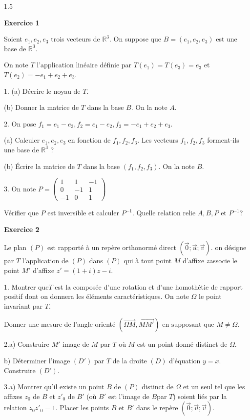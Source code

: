 \documentclass[12pt]{article}
\begin{document}
\begin{spacing}{1.5}

\medskip\textbf{Exercice 1}

Soient $e_1, e_2, e_3$ trois vecteurs de $\mathbb{R}^3$. On suppose que $B = (e_1,e_2,e_3)$ est une base de $\mathbb{R}^3$.
 
 On note $T$ l'application linéaire définie par $T(e_1) = T(e_3) = e_3$ et $T(e_2) = -e_1+e_2+e_3$.

1. (a) Décrire le noyau de $T$.
 
 (b) Donner la matrice de $T$ dans la base $B$. On la note $A$.
 
 2. On pose $f_1 = e_1-e_3, f_2 = e_1-e_2, f_3 = -e_1 +e_2 +e_3$.
 
 (a) Calculer $e_1, e_2, e_3$ en fonction de $f_1, f_2, f_3$. Les vecteurs $f_1, f_2, f_3$ forment-ils
 une base de $\mathbb{R}^3$ ?
 
 (b) Écrire la matrice de $T$ dans la base $(f_1,f_2,f_3)$. On la note $B$.
 
3. On note $P= \begin{pmatrix}
1 & 1 & -1 \\ 
0 & -1 & 1 \\ 
-1 & 0 & 1
\end{pmatrix}$

Vérifier que $P$ est inversible et calculer $P^{-1}$. Quelle relation relie $A,B,P$ et $P^{-1}$?

\medskip\textbf{Exercice 2}

Le plan $(P)$ est rapporté à un repère orthonormé direct $(\overrightarrow{0} ; \overrightarrow{u}; \overrightarrow{v})$. 
on désigne par $T$ l'application de $(P)$ dans $(P)$ qui à tout point $M$ d'affixe $z $associe le point $M'$ d'affixe $z' = (1 + i)z-i$. 

1. Montrer que$ T$ est la composée d'une rotation et d'une homothétie de rapport positif dont on donnera les éléments caractéristiques. On note $\Omega$ le point invariant par $T$. 

Donner une mesure de l'angle orienté $(\overrightarrow{\Omega M},\overrightarrow{MM'}) \text{ en supposant que }  M\neq \Omega$.


2.a) Construire $M'$ image de $M$ par $T$ où $M$ est un point donné distinct de $\Omega$. 

b) Déterminer l'image $(D')$ par $T$ de la droite $(D)$ d'équation $y = x$. Construire $(D')$. 

3.a) Montrer qu'il existe un point $B$ de $(P)$ distinct de $\Omega$ et un seul 
tel que les affixes $z_0$ de $B$ et $z'_0$ de $B'$ (où $B'$ est l'image de $B $par $T$) soient liés par la relation $z_0z'_0 = 1$. Placer les points $B$ et $B'$ dans le repère $(\overrightarrow{0} ; \overrightarrow{u}; \overrightarrow{v})$. 


\end{spacing}
\end{document}
